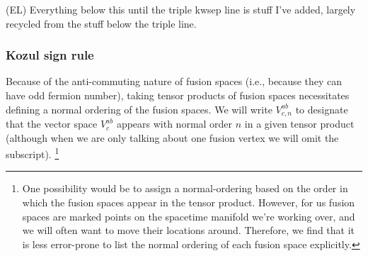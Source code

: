 \documentclass[12pt,a4paper]{article}
\newcommand{\ethan}[1]{{\color{amethyst}\footnotesize{(EL) #1}}}
\begin{document}
\ethan{Everything below this until the triple kwsep line is stuff I've added, largely recycled from the stuff below the triple line.}

\subsubsection{Kozul sign rule} Because of the anti-commuting nature of fusion spaces (i.e., because they can have odd fermion number), taking tensor products of fusion spaces necessitates defining a normal ordering of the fusion spaces. 
We will write $V^{ab}_{c,n}$ to designate that the vector space $V^{ab}_c$ appears with normal order $n$ in a given tensor product (although when we are only talking about one fusion vertex we will omit the subscript). 
\footnote{One possibility would be to assign a normal-ordering based on the order in which the fusion spaces appear in the tensor product. 
However, for us fusion spaces are marked points on the spacetime manifold we're working over, and we will often want to move their locations around. 
Therefore, we find that it is less error-prone to list the normal ordering of each fusion space explicitly.}
\end{document}
